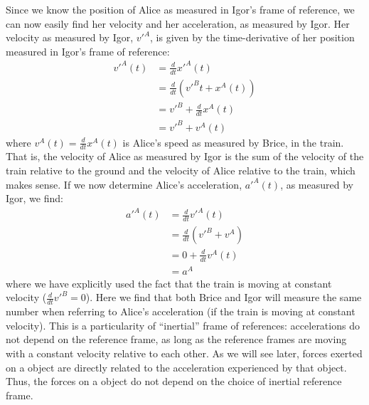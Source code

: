 Since we know the position of Alice as measured in Igor's frame of reference, we can now easily find her velocity and her acceleration, as measured by Igor. Her velocity as measured by Igor, $v'^A$, is given by the time-derivative of her position measured in Igor's frame of reference:
\begin{align}
v'^A(t)&=\frac{d}{dt}x'^A(t)\\
&=\frac{d}{dt}(v'^Bt+x^A(t))\\
&=v'^B+\frac{d}{dt}x^A(t)\\
&=v'^B+v^A(t)
\end{align}
where $v^A(t)=\frac{d}{dt}x^A(t)$ is Alice's speed as measured by Brice, in the train. That is, the velocity of Alice as measured by Igor is the sum of the velocity of the train relative to the ground and the velocity of Alice relative to the train, which makes sense. If we now determine Alice's acceleration, $a'^A(t)$, as measured by Igor, we find:
\begin{align}
a'^A(t)&=\frac{d}{dt}v'^A(t)\\
&=\frac{d}{dt}(v'^B+v^A)\\
&=0+\frac{d}{dt}v^A(t)\\
&=a^A
\end{align}
where we have explicitly used the fact that the train is moving at constant velocity ($\frac{d}{dt}v'^B=0$). Here we find that both Brice and Igor will measure the same number when referring to Alice's acceleration (if the train is moving at constant velocity). This is a particularity of ``inertial'' frame of references: accelerations do not depend on the reference frame, as long as the reference frames are moving with a constant velocity relative to each other. As we will see later, forces exerted on a object are directly related to the acceleration experienced by that object. Thus, the forces on a object do not depend on the choice of inertial reference frame. 

